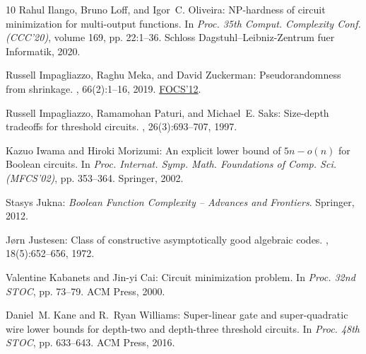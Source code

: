 \documentclass[11pt]{article}
\numberwithin{equation}{section}
\theoremstyle{definition}
\theoremstyle{plain}
\begin{document}
\begin{thebibliography}{10}
{\sc Rahul Ilango, Bruno Loff, and Igor~C. Oliveira}: {NP}-hardness of circuit
  minimization for multi-output functions.
\newblock In {\em Proc. 35th Comput. Complexity Conf. (CCC'20)}, volume 169,
  pp. 22:1--36. Schloss Dagstuhl--Leibniz-Zentrum fuer Informatik, 2020.

{\sc Russell Impagliazzo, Raghu Meka, and David Zuckerman}: Pseudorandomness
  from shrinkage.
, 66(2):1--16, 2019.
\newblock \prelim \href{https://doi.org/10.1109/10.1109/FOCS.2012.78}{FOCS'12}.

{\sc Russell Impagliazzo, Ramamohan Paturi, and Michael~E. Saks}: Size-depth
  tradeoffs for threshold circuits.
, 26(3):693--707, 1997.
\newblock [\epfmtdoi{10.1137/S0097539792282965}]

{\sc Kazuo Iwama and Hiroki Morizumi}: An explicit lower bound of $5n - o(n)$
  for {B}oolean circuits.
\newblock In {\em Proc. Internat. Symp. Math. Foundations of Comp. Sci.
  (MFCS'02)}, pp. 353--364. Springer, 2002.
\newblock [\epfmtdoi{10.1007/3-540-45687-2\_29}]

{\sc Stasys Jukna}: {\em Boolean Function Complexity -- Advances and
  Frontiers}.
\newblock Springer, 2012.
\newblock [\epfmtdoi{10.1007/978-3-642-24508-4}]

{\sc J{\o}rn Justesen}: Class of constructive asymptotically good algebraic
  codes.
, 18(5):652--656, 1972.

{\sc Valentine Kabanets and Jin{-}yi Cai}: Circuit minimization problem.
\newblock In {\em Proc. 32nd STOC}, pp. 73--79. ACM Press, 2000.

{\sc Daniel~M. Kane and R.~Ryan Williams}: Super-linear gate and
  super-quadratic wire lower bounds for depth-two and depth-three threshold
  circuits.
\newblock In {\em Proc. 48th STOC}, pp. 633--643. ACM Press, 2016.


\end{thebibliography}
\end{document}
